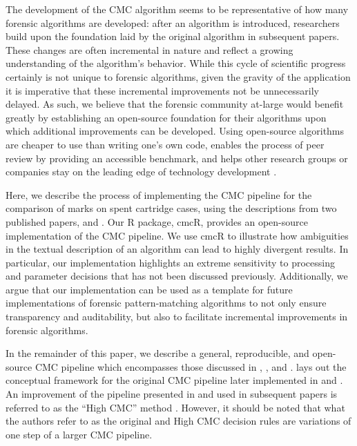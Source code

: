 \documentclass[11pt,]{isuthesis}
\begin{document}
The development of the CMC algorithm seems to be representative of how many forensic algorithms are developed: after an algorithm is introduced, researchers build upon the foundation laid by the original algorithm in subsequent papers.
These changes are often incremental in nature and reflect a growing understanding of the algorithm's behavior.
While this cycle of scientific progress certainly is not unique to forensic algorithms, given the gravity of the application it is imperative that these incremental improvements not be unnecessarily delayed.
As such, we believe that the forensic community at-large would benefit greatly by establishing an open-source foundation for their algorithms upon which additional improvements can be developed.
Using open-source algorithms are cheaper to use than writing one's own code, enables the process of peer review by providing an accessible benchmark, and helps other research groups or companies stay on the leading edge of technology development \citep{linux}.

Here, we describe the process of implementing the CMC pipeline for the comparison of marks on spent cartridge cases, using the descriptions from two published papers, \citet{song_3d_2014} and \citet{tong_improved_2015}.
Our R package, cmcR, provides an open-source implementation of the CMC pipeline.
We use cmcR to illustrate how ambiguities in the textual description of an algorithm can lead to highly divergent results.
In particular, our implementation highlights an extreme sensitivity to processing and parameter decisions that has not been discussed previously.
Additionally, we argue that our implementation can be used as a template for future implementations of forensic pattern-matching algorithms to not only ensure transparency and auditability, but also to facilitate incremental improvements in forensic algorithms.

In the remainder of this paper, we describe a general, reproducible, and open-source CMC pipeline which encompasses those discussed in \citet{song_proposed_2013}, \citet{song_3d_2014}, and \citet{tong_improved_2015}.
\citet{song_proposed_2013} lays out the conceptual framework for the original CMC pipeline later implemented in \citet{song_3d_2014} and \citet{tong_fired_2014}.
An improvement of the pipeline presented in \citet{tong_improved_2015} and used in subsequent papers is referred to as the ``High CMC'' method \citep{chen_convergence_2017}. However, it should be noted that what the authors refer to as the original and High CMC decision rules are variations of one step of a larger CMC pipeline.
\end{document}
